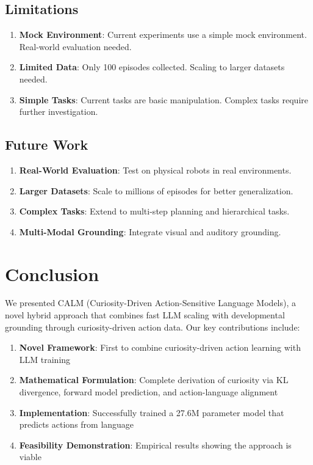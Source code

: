 \documentclass{IEEEtran}
\begin{document}
\subsection{Limitations}

\begin{enumerate}
    \item \textbf{Mock Environment}: Current experiments use a simple mock environment. Real-world evaluation needed.
    \item \textbf{Limited Data}: Only 100 episodes collected. Scaling to larger datasets needed.
    \item \textbf{Simple Tasks}: Current tasks are basic manipulation. Complex tasks require further investigation.
\end{enumerate}

\subsection{Future Work}

\begin{enumerate}
    \item \textbf{Real-World Evaluation}: Test on physical robots in real environments.
    \item \textbf{Larger Datasets}: Scale to millions of episodes for better generalization.
    \item \textbf{Complex Tasks}: Extend to multi-step planning and hierarchical tasks.
    \item \textbf{Multi-Modal Grounding}: Integrate visual and auditory grounding.
\end{enumerate}

\section{Conclusion}

We presented CALM (Curiosity-Driven Action-Sensitive Language Models), a novel hybrid approach that combines fast LLM scaling with developmental grounding through curiosity-driven action data. Our key contributions include:
\begin{enumerate}
    \item \textbf{Novel Framework}: First to combine curiosity-driven action learning with LLM training
    \item \textbf{Mathematical Formulation}: Complete derivation of curiosity via KL divergence, forward model prediction, and action-language alignment
    \item \textbf{Implementation}: Successfully trained a 27.6M parameter model that predicts actions from language
    \item \textbf{Feasibility Demonstration}: Empirical results showing the approach is viable
\end{enumerate}
\end{document}

